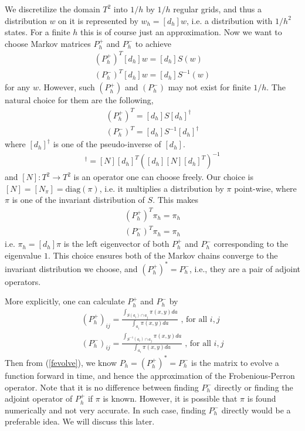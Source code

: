 \documentclass{article}
\begin{document}
We discretilize the domain $T^2$ into $1/h$ by $1/h$ regular grids, and
thus a distribution $w$ on it is represented by $w_h = [d_h]w$, i.e.
a distribution with $1/h^2$ states. For a finite $h$ this is of course
just an approximation. Now we want to choose Markov matrices $P_h^+$
and $P_h^-$ to achieve
 \begin{eqnarray}
 (P_h^+)^T [d_h]w = [d_h]S(w)\\
 (P_h^-)^T [d_h]w = [d_h]S^{-1}(w) \nonumber
 \end{eqnarray}
for any $w$. However, such $(P_h^+)$ and $(P_h^-)$ may not exist for
finite
 $1/h$. The natural choice for them are the following,
 \begin{eqnarray}
 (P_h^+)^T = [d_h]S[d_h]^\dagger \\
 (P_h^-)^T = [d_h]S^{-1}[d_h]^\dagger \nonumber
 \end{eqnarray}
where $[d_h]^\dagger$ is one of the pseudo-inverse of $[d_h]$.
 \begin{eqnarray}
 [d_h]^\dagger = [N][d_h]^T([d_h][N][d_h]^T)^{-1}
 \end{eqnarray}
and $[N]: T^2 \rightarrow T^2$ is an operator one can choose freely.
Our choice is $[N]=[N_{\pi}] = \text{diag}(\pi)$, i.e. it multiplies
a distribution by $\pi$ point-wise, where $\pi$ is one of the
invariant distribution of $S$. This makes
\begin{eqnarray}
  (P_h^+)^T \pi_h =  \pi_h \\
  (P_h^-)^T \pi_h =  \pi_h \nonumber
\end{eqnarray}
i.e. $ \pi_h =[d_h]\pi$ is the left eigenvector of both $P_h^+$ and
$P_h^-$ corresponding to the eigenvalue $1$. This choice ensures
both of the Markov chains converge to the invariant distribution we
choose, and $(P_h^+)^* = P_h^-$, i.e., they are a pair of adjoint
operators.

More explicitly, one can calculate $P_h^+$ and $P_h^-$ by
\begin{eqnarray}
\label{P definition}
     (P_h^+)_{ij} = \frac{\int_{S(a_i) \cap a_j  } \pi(x,y)da}{\int_{a_i} \pi(x,y) da
     } \mbox{   , for all } i,j\\
     (P_h^-)_{ij} = \frac{\int_{S^{-1}(a_i) \cap a_j  } \pi(x,y)da}{\int_{a_i} \pi(x,y) da \nonumber
     } \mbox{   , for all } i,j
\end{eqnarray}
Then from (\ref{fevolve}), we know $P_h =(P_h^+)^* = P_h^-$ is the
matrix to evolve a function forward in time, and hence the
approximation of the Frobenious-Perron operator. Note that it is no
difference between finding $P_h^-$ directly or finding the adjoint
operator of $P_h^+$ if $\pi$ is known. However, it is possible that
$\pi$ is found numerically and not very accurate. In such case,
finding $P_h^-$ directly would be a preferable idea. We will discuss
this later.
\end{document}
